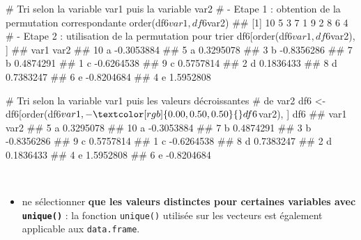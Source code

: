 \documentclass[12pt,twosided, notitlepage]{book}
\newenvironment{Shaded}{}{}
\newcommand{\CommentTok}[1]{\textcolor[rgb]{0.00,0.50,0.00}{#1}}
\newcommand{\KeywordTok}[1]{\textcolor[rgb]{0.00,0.00,1.00}{#1}}
\newcommand{\NormalTok}[1]{#1}
\newcommand{\OperatorTok}[1]{#1}
\newcommand{\StringTok}[1]{\textcolor[rgb]{0.00,0.50,0.50}{#1}}
\providecommand{\tightlist}{%
  \setlength{\itemsep}{0pt}\setlength{\parskip}{0pt}}
\renewenvironment{Shaded}{\begin{snugshade}}{\end{snugshade}}
\begin{document}
\begin{Shaded}
\begin{Highlighting}[]
\CommentTok{# Tri selon la variable var1 puis la variable var2}
\CommentTok{# - Etape 1 : obtention de la permutation correspondante}
\KeywordTok{order}\NormalTok{(df6}\OperatorTok{$}\NormalTok{var1, df6}\OperatorTok{$}\NormalTok{var2)}
\NormalTok{  ##  [1] 10  5  3  7  1  9  2  8  6  4}
\CommentTok{# - Etape 2 : utilisation de la permutation pour trier}
\NormalTok{df6[}\KeywordTok{order}\NormalTok{(df6}\OperatorTok{$}\NormalTok{var1, df6}\OperatorTok{$}\NormalTok{var2), ]}
\NormalTok{  ##    var1       var2}
\NormalTok{  ## 10    a -0.3053884}
\NormalTok{  ## 5     a  0.3295078}
\NormalTok{  ## 3     b -0.8356286}
\NormalTok{  ## 7     b  0.4874291}
\NormalTok{  ## 1     c -0.6264538}
\NormalTok{  ## 9     c  0.5757814}
\NormalTok{  ## 2     d  0.1836433}
\NormalTok{  ## 8     d  0.7383247}
\NormalTok{  ## 6     e -0.8204684}
\NormalTok{  ## 4     e  1.5952808}

\CommentTok{# Tri selon la variable var1 puis les valeurs décroissantes}
\CommentTok{# de var2}
\NormalTok{df6 <-}\StringTok{ }\NormalTok{df6[}\KeywordTok{order}\NormalTok{(df6}\OperatorTok{$}\NormalTok{var1, }\OperatorTok{-}\StringTok{ }\NormalTok{df6}\OperatorTok{$}\NormalTok{var2), ]}
\NormalTok{df6}
\NormalTok{  ##    var1       var2}
\NormalTok{  ## 5     a  0.3295078}
\NormalTok{  ## 10    a -0.3053884}
\NormalTok{  ## 7     b  0.4874291}
\NormalTok{  ## 3     b -0.8356286}
\NormalTok{  ## 9     c  0.5757814}
\NormalTok{  ## 1     c -0.6264538}
\NormalTok{  ## 8     d  0.7383247}
\NormalTok{  ## 2     d  0.1836433}
\NormalTok{  ## 4     e  1.5952808}
\NormalTok{  ## 6     e -0.8204684}
\end{Highlighting}
\end{Shaded}

~

\begin{itemize}
\tightlist
\item
  ne sélectionner \textbf{que les valeurs distinctes pour certaines
  variables avec \texttt{unique()}} : la
  fonction \texttt{unique()} utilisée sur les vecteurs est également
  applicable aux \texttt{data.frame}.
\end{itemize}
\end{document}
